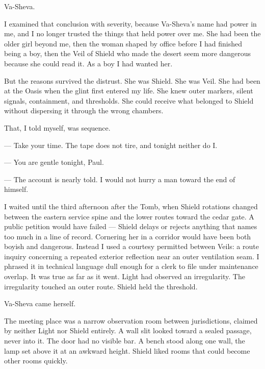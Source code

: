 Va-Sheva.\par

I examined that conclusion with severity, because Va-Sheva's name had power in me, and I no longer trusted the things that held power over me. She had been the older girl beyond me, then the woman shaped by office before I had finished being a boy, then the Veil of Shield who made the desert seem more dangerous because she could read it. As a boy I had wanted her.\par

But the reasons survived the distrust. She was Shield. She was Veil. She had been at the Oasis when the glint first entered my life. She knew outer markers, silent signals, containment, and thresholds. She could receive what belonged to Shield without dispersing it through the wrong chambers.\par

That, I told myself, was sequence.\par

\ornament

\begin{room}

--- Take your time. The tape does not tire, and tonight neither do I.

--- You are gentle tonight, Paul.

--- The account is nearly told. I would not hurry a man toward the end of himself.

\end{room}

\ornament

I waited until the third afternoon after the Tomb, when Shield rotations changed between the eastern service spine and the lower routes toward the cedar gate. A public petition would have failed --- Shield delays or rejects anything that names too much in a line of record. Cornering her in a corridor would have been both boyish and dangerous. Instead I used a courtesy permitted between Veils: a route inquiry concerning a repeated exterior reflection near an outer ventilation seam. I phrased it in technical language dull enough for a clerk to file under maintenance overlap. It was true as far as it went. Light had observed an irregularity. The irregularity touched an outer route. Shield held the threshold.\par

Va-Sheva came herself.\par

The meeting place was a narrow observation room between jurisdictions, claimed by neither Light nor Shield entirely. A wall slit looked toward a sealed passage, never into it. The door had no visible bar. A bench stood along one wall, the lamp set above it at an awkward height. Shield liked rooms that could become other rooms quickly.\par

